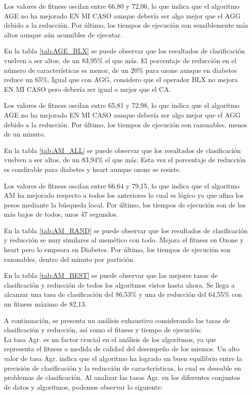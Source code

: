 Los valores de fitness oscilan entre 66,80 y 72,06, lo que indica que el algoritmo AGE no ha mejorado EN MI CASO aunque debería ser algo mejor que el AGG debido a la reducción. Por último, los tiempos de ejecución son sensiblemente más altos aunque aún asumibles de ejecutar.


En la tabla \ref{tab:AGE_BLX} se puede observar que los resultados de clasificación vuelven a ser altos, de un 83,95\% el que más. El porcentaje de reducción en el número de características es menor, de un 20\% para ozone aunque en diabetes reduce un 65\%. Igual que con AGG, considero que el operador BLX no mejora EN MI CASO pero debería ser igual o mejor que el CA.

Los valores de fitness oscilan entre 65,81 y 72,98, lo que indica que el algoritmo AGE no ha mejorado EN MI CASO aunque debería ser algo mejor que el AGG debido a la reducción. Por último, los tiempos de ejecución son razonables, menos de un minuto.


En la tabla \ref{tab:AM_ALL} se puede observar que los resultados de clasificación vuelven a ser altos, de un 83,94\% el que más. Esta vez el porcentaje de reducción es condirable para diabetes y heart aunque ozone se resiste.

Los valores de fitness oscilan entre 66,64 y 79,15, lo que indica que el algoritmo AM ha mejorado respecto a todos los anteriores lo cual es lógico ya que afina los pesos mediante la búsqueda local. Por último, los tiempos de ejecución son de los más bajos de todos, unos 47 segundos.


En la tabla \ref{tab:AM_RAND} se puede observar que los resultados de clasificación y reducción se muy similares al memético con todo. Mejora el fitness en Ozone y heart pero lo empeora en Diabetes. Por último, los tiempos de ejecución son razonables, dentro del minuto por partición.


En la tabla \ref{tab:AM_BEST} se puede observar que las mejores tasas de clasificación y reducción de todos los algoritmos vistos hasta ahora. Se llega a alcanzar una tasa de clasificación del 86,53\% y una de reducción del 64,55\% con un fitness máximo de 82,13.


 A continuación, se presenta un análisis exhaustivo considerando las tasas de clasificación y reducción, así como el fitness y tiempo de ejecución:\\
 
 La tasa Agr. es un factor crucial en el análisis de los algoritmos, ya que representa el fitness o medida de calidad del desempeño de los mismos. Un alto valor de tasa Agr. indica que el algoritmo ha logrado un buen equilibrio entre la precisión de clasificación y la reducción de características, lo cual es deseable en problemas de clasificación. Al analizar las tasas Agr. en los diferentes conjuntos de datos y algoritmos, podemos observar lo siguiente:
 
